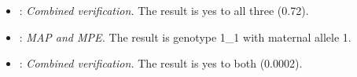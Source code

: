 \begingroup\footnotesize\raggedright
\begin{itemize}[nosep,leftmargin=*]
\item {}: \emph{Combined verification.}  The result is yes to all three (0.72).
\item {}: \emph{MAP and MPE.}  The result is genotype 1\_1 with maternal allele 1.
\item {}: \emph{Combined verification.}  The result is yes to both (0.0002).
\end{itemize}
\endgroup

